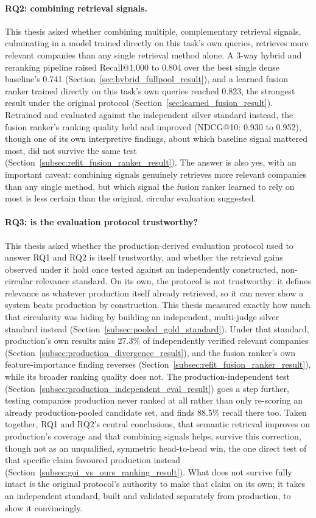 \documentclass[a4paper,oneside,bibliography=totoc]{scrbook}
\begin{document}
\paragraph{RQ2: combining retrieval signals.} This thesis asked whether combining multiple, complementary retrieval signals, culminating in a model trained directly on this task's own queries, retrieves more relevant companies than any single retrieval method alone. A 3-way hybrid and reranking pipeline raised Recall@1{,}000 to 0.804 over the best single dense baseline's 0.741 (Section~\ref{sec:hybrid_fullpool_result}), and a learned fusion ranker trained directly on this task's own queries reached 0.823, the strongest result under the original protocol (Section~\ref{sec:learned_fusion_result}). Retrained and evaluated against the independent silver standard instead, the fusion ranker's ranking quality held and improved (NDCG@10: 0.930 to 0.952), though one of its own interpretive findings, about which baseline signal mattered most, did not survive the same test (Section~\ref{subsec:refit_fusion_ranker_result}). The answer is also yes, with an important caveat: combining signals genuinely retrieves more relevant companies than any single method, but which signal the fusion ranker learned to rely on most is less certain than the original, circular evaluation suggested.

\paragraph{RQ3: is the evaluation protocol trustworthy?} This thesis asked whether the production-derived evaluation protocol used to answer RQ1 and RQ2 is itself trustworthy, and whether the retrieval gains observed under it hold once tested against an independently constructed, non-circular relevance standard. On its own, the protocol is not trustworthy: it defines relevance as whatever production itself already retrieved, so it can never show a system beats production by construction. This thesis measured exactly how much that circularity was hiding by building an independent, multi-judge silver standard instead (Section~\ref{subsec:pooled_gold_standard}). Under that standard, production's own results miss 27.3\% of independently verified relevant companies (Section~\ref{subsec:production_divergence_result}), and the fusion ranker's own feature-importance finding reverses (Section~\ref{subsec:refit_fusion_ranker_result}), while its broader ranking quality does not. The production-independent test (Section~\ref{subsec:production_independent_eval_result}) goes a step further, testing companies production never ranked at all rather than only re-scoring an already production-pooled candidate set, and finds 88.5\% recall there too. Taken together, RQ1 and RQ2's central conclusions, that semantic retrieval improves on production's coverage and that combining signals helps, survive this correction, though not as an unqualified, symmetric head-to-head win, the one direct test of that specific claim favoured production instead (Section~\ref{subsec:goi_vs_ours_ranking_result}). What does not survive fully intact is the original protocol's authority to make that claim on its own; it takes an independent standard, built and validated separately from production, to show it convincingly.
\end{document}
